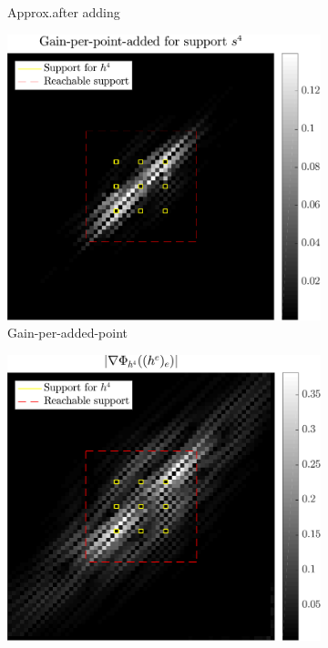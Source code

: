 \begin{figure}[!h]
\begin{subfigure}[b]{0.32\linewidth}
\caption{Approx.\@ after adding}\label{fig_beforeafter-approx_after}
\end{subfigure}
\begin{subfigure}[b]{0.32\linewidth}\centering
\includegraphics[width=\linewidth]{figures/before_after/xp_128x128_sc2_angl1_K3_S3_node4before_objmatrix.pdf}
\caption{Gain-per-added-point}\label{fig_beforeafter-gain}
\end{subfigure}
\begin{subfigure}[b]{0.32\linewidth}\centering
\includegraphics[width=\linewidth]{figures/before_after/xp_128x128_sc2_angl1_K3_S3_node4before_partgrad4.pdf}

\end{subfigure}
\end{figure}
